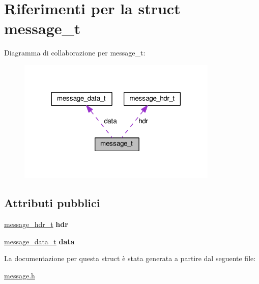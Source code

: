 \hypertarget{structmessage__t}{}\section{Riferimenti per la struct message\+\_\+t}
\label{structmessage__t}


Diagramma di collaborazione per message\+\_\+t\+:
\nopagebreak
\begin{figure}[H]
\begin{center}
\leavevmode
\includegraphics[width=270pt]{structmessage__t__coll__graph}
\end{center}
\end{figure}
\subsection*{Attributi pubblici}
\begin{DoxyCompactItemize}
\item 
\hyperlink{structmessage__hdr__t}{message\+\_\+hdr\+\_\+t} {\bfseries hdr}\hypertarget{structmessage__t_a6c9e3c76c26fd15afd27fca633875978}{}\label{structmessage__t_a6c9e3c76c26fd15afd27fca633875978}

\item 
\hyperlink{structmessage__data__t}{message\+\_\+data\+\_\+t} {\bfseries data}\hypertarget{structmessage__t_a4246f40b480c7d84ff6319ef2ae7b305}{}\label{structmessage__t_a4246f40b480c7d84ff6319ef2ae7b305}

\end{DoxyCompactItemize}


La documentazione per questa struct è stata generata a partire dal seguente file\+:\begin{DoxyCompactItemize}
\item 
\hyperlink{message_8h}{message.\+h}\end{DoxyCompactItemize}
